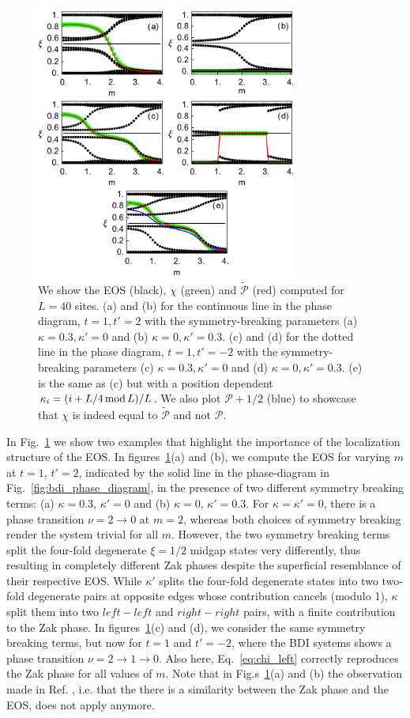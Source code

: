 \documentclass[twocolumn,amsmath,longbibliography,amssymb,superscriptaddress]{revtex4-1}
\begin{document}
\begin{figure}[t]
\centering
\includegraphics[width=86mm]{fig4comp.pdf}
\caption{We show the EOS (black), $\chi$ (green) and $\tilde{\mathcal{P}}$ (red) computed for $L=40$ sites. (a) and (b) for the continuous line in the phase diagram, $t=1,t'=2$  with the symmetry-breaking parameters (a) $\kappa=0.3,\kappa'=0$ and (b) $\kappa=0,\kappa'=0.3$. (c) and (d) for the dotted line in the phase diagram, $t=1,t'=-2$  with the symmetry-breaking parameters (c) $\kappa=0.3,\kappa'=0$ and (d) $\kappa=0,\kappa'=0.3$. (e) is the same as (c) but with a position dependent $\kappa_i=(i+L/4 \, {\rm mod}\, L)/L$. We also plot $\mathcal{P}+1/2$ (blue) to showcase that $\chi$ is indeed equal to $\tilde{\mathcal{P}}$ and not $\mathcal{P}$. }
	\label{2}
\end{figure}

In Fig.~\ref{2} we show two examples that highlight the importance of the localization structure of the EOS. 
In figures~\ref{2}(a) and (b), we compute the EOS for varying $m$ at  $t=1$, $t'=2$, indicated by the solid line  in the phase-diagram in Fig.~\ref{fig:bdi_phase_diagram}, in the presence of two different symmetry breaking terms: (a) $\kappa =0.3$, $\kappa'=0$ and (b) $\kappa=0$, $\kappa'=0.3$.  
For $\kappa=\kappa'=0$, there is a phase transition $\nu = 2 \rightarrow 0 $ at $m=2$, whereas both choices of symmetry breaking render the system trivial  for all $m$.
However, the two symmetry breaking terms split the four-fold degenerate $\xi=1/2$ midgap states very differently, thus resulting in completely different Zak phases despite the superficial resemblance of their respective EOS.  
While $\kappa'$ splits the four-fold degenerate states into two two-fold degenerate pairs at opposite edges whose contribution cancels (modulo 1), $\kappa$ split them into two $left-left$ and $right-right$ pairs, with a finite contribution to the Zak phase. 
In figures~\ref{2}(c) and (d), we consider the same symmetry breaking terms, but now for $t=1$ and $t'=-2$, where the BDI systems shows a phase transition  $\nu=2\rightarrow 1\rightarrow 0$. 
Also here, Eq.~\eqref{eq:chi_left} correctly reproduces the Zak phase for all values of $m$. 
Note that in Fig.s~\ref{2}(a) and (b) the observation made in Ref. \cite{Huang2012}, i.e. that the there is a similarity between the Zak phase and the EOS, does not apply anymore. 
\end{document}
